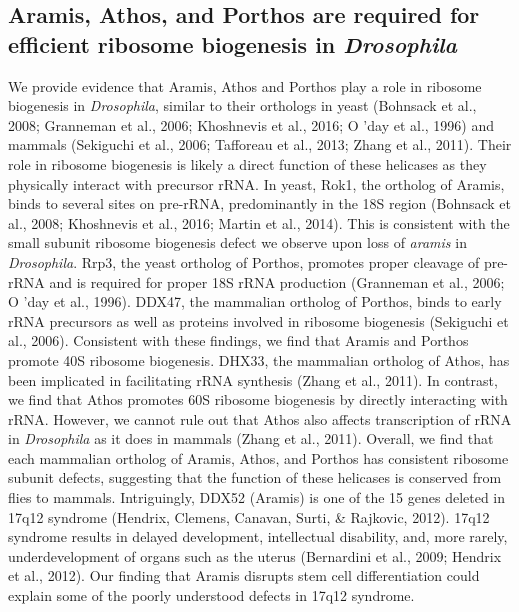 \documentclass[12pt,oneside]{reedthesis}
\begin{document}
\hypertarget{aramis-athos-and-porthos-are-required-for-efficient-ribosome-biogenesis-in-drosophila}{%
\subsection{\texorpdfstring{Aramis, Athos, and Porthos are required for efficient ribosome biogenesis in \emph{Drosophila}}{Aramis, Athos, and Porthos are required for efficient ribosome biogenesis in Drosophila}}\label{aramis-athos-and-porthos-are-required-for-efficient-ribosome-biogenesis-in-drosophila}}

We provide evidence that Aramis, Athos and Porthos play a role in
ribosome biogenesis in \emph{Drosophila}, similar to their orthologs in yeast
(Bohnsack et al., 2008; Granneman et al., 2006; Khoshnevis et al., 2016; O 'day et al., 1996) and
mammals (Sekiguchi et al., 2006; Tafforeau et al., 2013; Zhang et al., 2011). Their role in ribosome
biogenesis is likely a direct function of these helicases as they
physically interact with precursor rRNA. In yeast, Rok1, the ortholog of
Aramis, binds to several sites on pre-rRNA, predominantly in the 18S
region (Bohnsack et al., 2008; Khoshnevis et al., 2016; Martin et al., 2014). This is consistent with the
small subunit ribosome biogenesis defect we observe upon loss of
\emph{aramis} in \emph{Drosophila}. Rrp3, the yeast ortholog of Porthos, promotes
proper cleavage of pre-rRNA and is required for proper 18S rRNA
production (Granneman et al., 2006; O 'day et al., 1996). DDX47, the
mammalian ortholog of Porthos, binds to early rRNA precursors as well as
proteins involved in ribosome biogenesis
(Sekiguchi et al., 2006). Consistent with these findings,
we find that Aramis and Porthos promote 40S ribosome biogenesis. DHX33,
the mammalian ortholog of Athos, has been implicated in facilitating
rRNA synthesis (Zhang et al., 2011). In contrast,
we find that Athos promotes 60S ribosome biogenesis by directly
interacting with rRNA. However, we cannot rule out that Athos also
affects transcription of rRNA in \emph{Drosophila} as it does in mammals
(Zhang et al., 2011). Overall, we find that each
mammalian ortholog of Aramis, Athos, and Porthos has consistent ribosome
subunit defects, suggesting that the function of these helicases is
conserved from flies to mammals. Intriguingly, DDX52 (Aramis) is one of
the 15 genes deleted in 17q12 syndrome
(Hendrix, Clemens, Canavan, Surti, \& Rajkovic, 2012). 17q12 syndrome results in
delayed development, intellectual disability, and, more rarely,
underdevelopment of organs such as the uterus
(Bernardini et al., 2009; Hendrix et al., 2012). Our finding that Aramis
disrupts stem cell differentiation could explain some of the poorly
understood defects in 17q12 syndrome.
\end{document}
